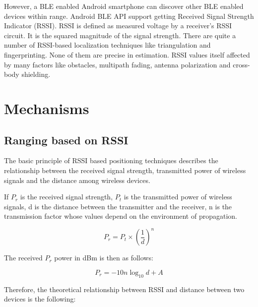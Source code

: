 \documentclass[conference,a4paper]{../../sty/IEEEtran}
\begin{document}
However, a BLE enabled Android smartphone can discover other BLE enabled devices within range. Android BLE API support getting Received Signal Strength Indicator (RSSI). RSSI is defined as measured voltage by a receiver’s RSSI circuit. It is the squared magnitude of the signal strength. There are quite a number of RSSI-based localization techniques like triangulation and fingerprinting. None of them are precise in estimation. RSSI values itself affected by many factors like obstacles, multipath fading, antenna polarization and cross-body shielding.
 
\section{Mechanisms}

\subsection{Ranging based on RSSI}


 

The basic principle of RSSI based positioning techniques describes the relationship between the received signal strength, transmitted power of wireless signals and the distance among wireless devices.

If $P_{r}$ is the received signal strength, $P_{t}$ is the transmitted power of wireless 
signals, d is the distance between the transmitter and the receiver, n is the transmission factor whose values depend on the environment of propagation. \cite{xu2010distance}

\begin{equation}
  P_{r} = P_{t} \times (\frac{1}{d})^{n}
 \label{eq1}
\end{equation}

The received $P_{r}$ power in dBm is then as follows:

\begin{equation}
  P_{r} =-10n \log_{10}d + A
 \label{eq2}
\end{equation}

Therefore, the theoretical relationship between RSSI and distance between two devices is the following: \cite{chung2007enhanced}
\end{document}
